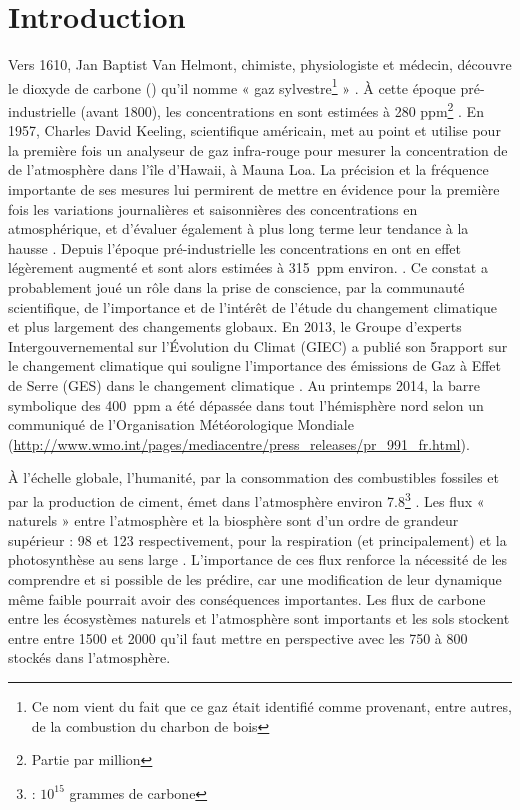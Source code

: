\chapter*{Introduction}
\newpage

Vers 1610, Jan Baptist Van Helmont, chimiste, physiologiste et médecin, découvre le dioxyde de carbone (\coo) qu'il nomme « gaz sylvestre\footnote{Ce nom vient du fait que ce gaz était identifié comme provenant, entre autres, de la combustion du charbon de bois} » \citep{philippedesouabe-zyriane1988}.
À cette époque pré-industrielle (avant 1800), les concentrations en \coo sont estimées à 280 ppm\footnote{Partie par million} \citep{Siegenthaler1987}.
En 1957, Charles David Keeling, scientifique américain, met au point et utilise pour la première fois un analyseur de gaz infra-rouge pour mesurer la concentration de \coo de l'atmosphère dans l'île d'Hawaii, à Mauna Loa.
La précision et la fréquence importante de ses mesures lui permirent de mettre en évidence pour la première fois les variations journalières et saisonnières des concentrations en \coo atmosphérique, et d'évaluer également à plus long terme leur tendance à la hausse \citep{harris2010}.
Depuis l'époque pré-industrielle les concentrations en \coo ont en effet légèrement augmenté et sont alors estimées à \SI{315}{ppm} environ. \citep{pales1965}.
Ce constat a probablement joué un rôle dans la prise de conscience, par la communauté scientifique, de l'importance et de l'intérêt de l'étude du changement climatique et plus largement des changements globaux.
En 2013, le Groupe d'experts Intergouvernemental sur l'Évolution du Climat (GIEC) a publié son 5\ieme rapport sur le changement climatique qui souligne l'importance des émissions de Gaz à Effet de Serre (GES) dans le changement climatique \citep{stocker2013}.
Au printemps 2014, la barre symbolique des \SI{400}{ppm} a été dépassée dans tout l'hémisphère nord selon un communiqué de l'Organisation Météorologique Mondiale (\url{http://www.wmo.int/pages/mediacentre/press_releases/pr_991_fr.html}).

À l'échelle globale, l'humanité, par la consommation des combustibles fossiles et par la production de ciment, émet dans l'atmosphère environ \SI{7.8}{\pgca}\footnote{\si{\pgc} : $10^{15}$ grammes de carbone} \citep{Ciais2014}.
Les flux « naturels » entre l'atmosphère et la biosphère sont d'un ordre de grandeur supérieur : \num{98} et \SI{123}{\pgca} respectivement, pour la respiration (\coo et \chh principalement) et la photosynthèse au sens large \citep{Bond-Lamberty2010,Beer2010}.
L'importance de ces flux renforce la nécessité de les comprendre et si possible de les prédire, car une modification de leur dynamique même faible pourrait avoir des conséquences importantes.
Les flux de carbone entre les écosystèmes naturels et l'atmosphère sont importants et les sols stockent entre entre \num{1500} et \SI{2000}{\pgc} qu'il faut mettre en perspective avec les \num{750} à \SI{800}{\pgc} stockés dans l'atmosphère.

